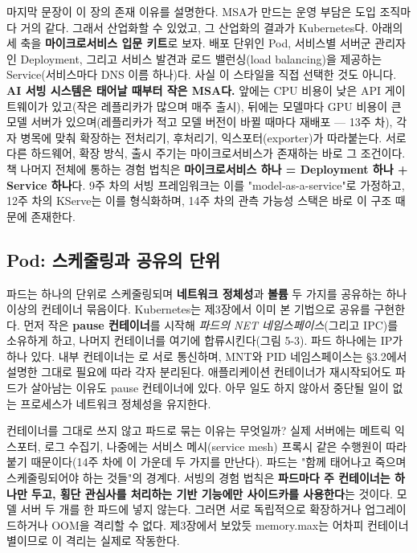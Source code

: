 \vspace{3.0pt}

마지막 문장이 이 장의 존재 이유를 설명한다. MSA가 만드는 운영 부담은 도입 조직마다 거의 같다. 그래서 산업화할 수 있었고, 그 산업화의 결과가 Kubernetes다. 아래의 세 축을 \textbf{마이크로서비스 입문 키트}로 보자. 배포 단위인 Pod, 서비스별 서버군 관리자인 Deployment, 그리고 서비스 발견과 로드 밸런싱(load balancing)을 제공하는 Service(서비스마다 DNS 이름 하나)다. 사실 이 스타일을 직접 선택한 것도 아니다. \textbf{AI 서빙 시스템은 태어날 때부터 작은 MSA다.} 앞에는 CPU 비용이 낮은 API 게이트웨이가 있고(작은 레플리카가 많으며 매주 출시), 뒤에는 모델마다 GPU 비용이 큰 모델 서버가 있으며(레플리카가 적고 모델 버전이 바뀔 때마다 재배포 — 13주 차), 각자 병목에 맞춰 확장하는 전처리기, 후처리기, 익스포터(exporter)가 따라붙는다. 서로 다른 하드웨어, 확장 방식, 출시 주기는 마이크로서비스가 존재하는 바로 그 조건이다. 책 나머지 전체에 통하는 경험 법칙은 \textbf{마이크로서비스 하나 = Deployment 하나 + Service 하나}다. 9주 차의 서빙 프레임워크는 이를 "model-as-a-service"로 가정하고, 12주 차의 KServe는 이를 형식화하며, 14주 차의 관측 가능성 스택은 바로 이 구조 때문에 존재한다.

\subsection*{Pod: 스케줄링과 공유의 단위}

파드는 하나의 단위로 스케줄링되며 \textbf{네트워크 정체성}과 \textbf{볼륨} 두 가지를 공유하는 하나 이상의 컨테이너 묶음이다. Kubernetes는 제3장에서 이미 본 기법으로 공유를 구현한다. 먼저 작은 \textbf{pause 컨테이너}를 시작해 \textit{파드의 NET 네임스페이스}(그리고 IPC)를 소유하게 하고, 나머지 컨테이너를 여기에 합류시킨다(그림 5-3). 파드 하나에는 IP가 하나 있다. 내부 컨테이너는 로 서로 통신하며, MNT와 PID 네임스페이스는 §3.2에서 설명한 그대로 필요에 따라 각자 분리된다. 애플리케이션 컨테이너가 재시작되어도 파드가 살아남는 이유도 pause 컨테이너에 있다. 아무 일도 하지 않아서 중단될 일이 없는 프로세스가 네트워크 정체성을 유지한다.

컨테이너를 그대로 쓰지 않고 파드로 묶는 이유는 무엇일까? 실제 서버에는 메트릭 익스포터, 로그 수집기, 나중에는 서비스 메시(service mesh) 프록시 같은 수행원이 따라붙기 때문이다(14주 차에 이 가운데 두 가지를 만난다). 파드는 "함께 태어나고 죽으며 스케줄링되어야 하는 것들"의 경계다. 서빙의 경험 법칙은 \textbf{파드마다 주 컨테이너는 하나만 두고, 횡단 관심사를 처리하는 기반 기능에만 사이드카를 사용한다}는 것이다. 모델 서버 두 개를 한 파드에 넣지 않는다. 그러면 서로 독립적으로 확장하거나 업그레이드하거나 OOM을 격리할 수 없다. 제3장에서 보았듯 memory.max는 어차피 컨테이너별이므로 이 격리는 실제로 작동한다.

